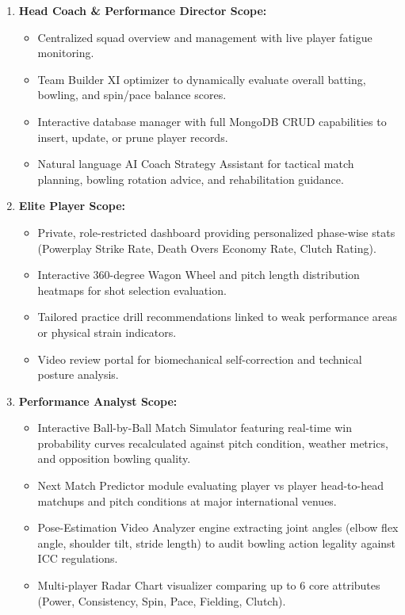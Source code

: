 \documentclass[12pt,a4paper]{report}
\begin{document}
\begin{enumerate}
    \item \textbf{Head Coach \& Performance Director Scope:}
    \begin{itemize}
        \item Centralized squad overview and management with live player fatigue monitoring.
        \item Team Builder XI optimizer to dynamically evaluate overall batting, bowling, and spin/pace balance scores.
        \item Interactive database manager with full MongoDB CRUD capabilities to insert, update, or prune player records.
        \item Natural language AI Coach Strategy Assistant for tactical match planning, bowling rotation advice, and rehabilitation guidance.
    \end{itemize}
    
    \item \textbf{Elite Player Scope:}
    \begin{itemize}
        \item Private, role-restricted dashboard providing personalized phase-wise stats (Powerplay Strike Rate, Death Overs Economy Rate, Clutch Rating).
        \item Interactive 360-degree Wagon Wheel and pitch length distribution heatmaps for shot selection evaluation.
        \item Tailored practice drill recommendations linked to weak performance areas or physical strain indicators.
        \item Video review portal for biomechanical self-correction and technical posture analysis.
    \end{itemize}
    
    \item \textbf{Performance Analyst Scope:}
    \begin{itemize}
        \item Interactive Ball-by-Ball Match Simulator featuring real-time win probability curves recalculated against pitch condition, weather metrics, and opposition bowling quality.
        \item Next Match Predictor module evaluating player vs player head-to-head matchups and pitch conditions at major international venues.
        \item Pose-Estimation Video Analyzer engine extracting joint angles (elbow flex angle, shoulder tilt, stride length) to audit bowling action legality against ICC regulations.
        \item Multi-player Radar Chart visualizer comparing up to 6 core attributes (Power, Consistency, Spin, Pace, Fielding, Clutch).
    \end{itemize}
\end{enumerate}
\end{document}
